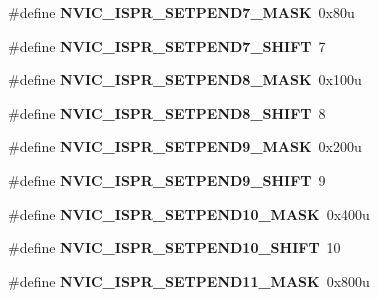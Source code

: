 \begin{DoxyCompactItemize}
\#define {\bfseries N\+V\+I\+C\+\_\+\+I\+S\+P\+R\+\_\+\+S\+E\+T\+P\+E\+N\+D7\+\_\+\+M\+A\+SK}~0x80u
\item 
\mbox{\label{group___n_v_i_c___register___masks_ga76be38c36982b8f598ba47966112ed23}} 
\#define {\bfseries N\+V\+I\+C\+\_\+\+I\+S\+P\+R\+\_\+\+S\+E\+T\+P\+E\+N\+D7\+\_\+\+S\+H\+I\+FT}~7
\item 
\mbox{\label{group___n_v_i_c___register___masks_ga3e0575e0fb0344ab721826e4e773001b}} 
\#define {\bfseries N\+V\+I\+C\+\_\+\+I\+S\+P\+R\+\_\+\+S\+E\+T\+P\+E\+N\+D8\+\_\+\+M\+A\+SK}~0x100u
\item 
\mbox{\label{group___n_v_i_c___register___masks_gaf5c6f973c6ecda3f7406d6983f4e3dbd}} 
\#define {\bfseries N\+V\+I\+C\+\_\+\+I\+S\+P\+R\+\_\+\+S\+E\+T\+P\+E\+N\+D8\+\_\+\+S\+H\+I\+FT}~8
\item 
\mbox{\label{group___n_v_i_c___register___masks_gad0e1c1d657c6504f1ff53695925d1fc1}} 
\#define {\bfseries N\+V\+I\+C\+\_\+\+I\+S\+P\+R\+\_\+\+S\+E\+T\+P\+E\+N\+D9\+\_\+\+M\+A\+SK}~0x200u
\item 
\mbox{\label{group___n_v_i_c___register___masks_ga66be4663168aeb6638c0d7fed93c8a73}} 
\#define {\bfseries N\+V\+I\+C\+\_\+\+I\+S\+P\+R\+\_\+\+S\+E\+T\+P\+E\+N\+D9\+\_\+\+S\+H\+I\+FT}~9
\item 
\mbox{\label{group___n_v_i_c___register___masks_ga8698f6b4ea84ef15039f3b8828bdee0e}} 
\#define {\bfseries N\+V\+I\+C\+\_\+\+I\+S\+P\+R\+\_\+\+S\+E\+T\+P\+E\+N\+D10\+\_\+\+M\+A\+SK}~0x400u
\item 
\mbox{\label{group___n_v_i_c___register___masks_gafa0ff49a4436936dd29a5237e3cbf024}} 
\#define {\bfseries N\+V\+I\+C\+\_\+\+I\+S\+P\+R\+\_\+\+S\+E\+T\+P\+E\+N\+D10\+\_\+\+S\+H\+I\+FT}~10
\item 
\mbox{\label{group___n_v_i_c___register___masks_ga89ac5b32c32d84a76d8498cb83d338d8}} 
\#define {\bfseries N\+V\+I\+C\+\_\+\+I\+S\+P\+R\+\_\+\+S\+E\+T\+P\+E\+N\+D11\+\_\+\+M\+A\+SK}~0x800u

\end{DoxyCompactItemize}
